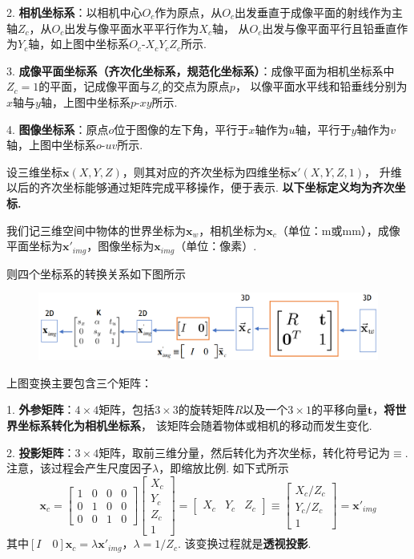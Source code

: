\documentclass[12pt, a4paper, oneside]{ctexart}
\numberwithin{equation}{section}  %
\theoremstyle{definition}
\def\bd{\boldsymbol}        %
\def\Z{\mathbb{Z}}          %
\begin{document}
2. \textbf{相机坐标系}：以相机中心$O_c$作为原点，从$O_c$出发垂直于成像平面的射线作为主轴$Z_c$，从$O_c$出发与像平面水平平行作为$X_c$轴，
从$O_c$出发与像平面平行且铅垂直作为$Y_c$轴，如上图中坐标系$O_c\text{-}X_cY_cZ_c$所示.

3. \textbf{成像平面坐标系（齐次化坐标系，规范化坐标系）}：成像平面为相机坐标系中$Z_c=1$的平面，记成像平面与$Z_c$的交点为原点$p$，
以像平面水平线和铅垂线分别为$x$轴与$y$轴，上图中坐标系$p\text{-}xy$所示.

4. \textbf{图像坐标系}：原点$o$位于图像的左下角，平行于$x$轴作为$u$轴，平行于$y$轴作为$v$轴，上图中坐标系$o\text{-}uv$所示.

设三维坐标$\bd{x}(X,Y,Z)$，则其对应的齐次坐标为四维坐标$\bd{x'}(X,Y,Z,1)$，
升维以后的齐次坐标能够通过矩阵完成平移操作，便于表示. \textbf{以下坐标定义均为齐次坐标.}

我们记三维空间中物体的世界坐标为$\bd{x}_w$，相机坐标为$\bd{x}_c$（单位：m或mm），成像平面坐标为$\bd{x}'_{img}$，图像坐标为$\bd{x}_{img}$（单位：像素）.

则四个坐标系的转换关系如下图所示
\clearpage
\begin{figure}[htbp]
    \centering
    \includegraphics[scale=0.55]{转换坐标.png}
\end{figure}

上图变换主要包含三个矩阵：

1. \textbf{外参矩阵}：$4\times 4$矩阵，包括$3\times 3$的旋转矩阵$R$以及一个$3\times 1$的平移向量$\bd{t}$，\textbf{将世界坐标系转化为相机坐标系}，
该矩阵会随着物体或相机的移动而发生变化.

2. \textbf{投影矩阵}：$3\times 4$矩阵，取前三维分量，然后转化为齐次坐标，转化符号记为$\equiv$. 注意，该过程会产生尺度因子$\lambda$，即缩放比例. 如下式所示
\begin{equation*}
    [I\quad 0]\bd{x}_c = \left[\begin{matrix}
        1&0&0&0\\0&1&0&0\\0&0&1&0
    \end{matrix}\right]
    \left[\begin{matrix}
        X_c\\Y_c\\Z_c\\1
    \end{matrix}\right]=\left[\begin{matrix}
        X_c&Y_c&Z_c
    \end{matrix}\right]\equiv\left[\begin{matrix}
        X_c/Z_c\\Y_c/Z_c\\1
    \end{matrix}\right] = \bd{x}'_{img}
\end{equation*}
其中$[I\quad 0]\bd{x}_c = \lambda \bd{x}'_{img}$，$\lambda = 1/Z_c$. 该变换过程就是\textbf{透视投影}.
\end{document}

